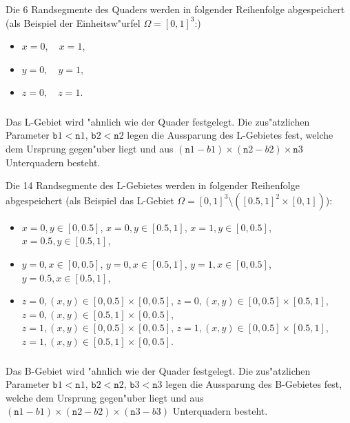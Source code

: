 \documentclass[11pt,a4paper]{article}
\begin{document}
Die 6 Randsegmente des Quaders werden in folgender Reihenfolge abgespeichert
(als Beispiel der Einheitsw"urfel $\Omega=[0,1]^3$:) 
\begin{itemize}
    \item $x=0, \quad x=1$, 
    \item $y=0, \quad y=1$, 
    \item $z=0, \quad z=1$.
\end{itemize}

\subsubsection{}  Das L-Gebiet wird "ahnlich wie der Quader
festgelegt. Die zus"atzlichen Parameter ${\mathtt b1}<{\mathtt n1}$, ${\mathtt
b2}<{\mathtt n2}$ legen die Aussparung des L-Gebietes fest, welche dem
Ursprung gegen"uber liegt und aus $({\mathtt n1-b1})\times({\mathtt
n2-b2})\times{\mathtt n3}$ Unterquadern besteht.

Die 14 Randsegmente des L-Gebietes werden in folgender Reihenfolge
abgespeichert (als Beispiel das L-Gebiet $\Omega=[0,1]^3\setminus
([0.5,1]^2\times[0,1])$):
\begin{itemize}
    \item $x=0, y\in[0,0.5]$, \quad
    $x=0, y\in[0.5,1]$, \quad
    $x=1, y\in[0,0.5]$, \quad
    $x=0.5, y\in[0.5,1]$,
    \item $y=0, x\in[0,0.5]$, \quad
    $y=0, x\in[0.5,1]$, \quad
    $y=1, x\in[0,0.5]$, \quad
    $y=0.5, x\in[0.5,1]$,
    \item $z=0, (x,y)\in[0,0.5]\times[0,0.5]$, \quad
    $z=0, (x,y)\in[0,0.5]\times[0.5,1]$, \quad
    $z=0, (x,y)\in[0.5,1]\times[0,0.5]$, \\
    $z=1, (x,y)\in[0,0.5]\times[0,0.5]$, \quad
    $z=1, (x,y)\in[0,0.5]\times[0.5,1]$, \quad
    $z=1, (x,y)\in[0.5,1]\times[0,0.5]$.
\end{itemize}
 
\subsubsection{}  Das B-Gebiet wird "ahnlich wie der Quader
festgelegt. Die zus"atzlichen Parameter ${\mathtt b1}<{\mathtt n1}$, ${\mathtt
b2}<{\mathtt n2}$, ${\mathtt b3}<{\mathtt n3}$ legen die Aussparung des
B-Gebietes fest, welche dem Ursprung gegen"uber liegt und aus $({\mathtt
n1-b1})\times({\mathtt n2-b2})\times({\mathtt n3-b3})$ Unterquadern besteht.
\end{document}
